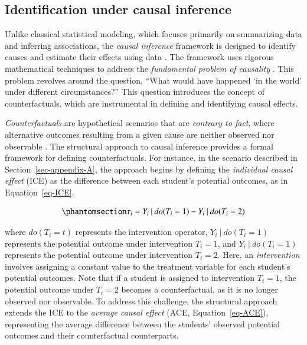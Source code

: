 \documentclass[
  authoryear,
  review,
  1p]{elsarticle}
\begin{document}
\subsection{Identification under causal inference}\label{sec-appendix-B}

Unlike classical statistical modeling, which focuses primarily on
summarizing data and inferring associations, the \emph{causal inference}
framework is designed to identify causes and estimate their effects
using data \citep{Shaughnessy_et_al_2010, Neal_2020}. The framework uses
rigorous mathematical techniques to address the \emph{fundamental
problem of causality}
\citep{Pearl_2009, Pearl_et_al_2016, Morgan_et_al_2014}. This problem
revolves around the question, ``What would have happened `in the world'
under different circumstances?'' This question introduces the concept of
counterfactuals, which are instrumental in defining and identifying
causal effects.

\emph{Counterfactuals} are hypothetical scenarios that are
\emph{contrary to fact}, where alternative outcomes resulting from a
given cause are neither observed nor observable
\citep{Neal_2020, Counterfactual_2024}. The structural approach to
causal inference \citep{Pearl_2009, Pearl_et_al_2016} provides a formal
framework for defining counterfactuals. For instance, in the scenario
described in Section~\ref{sec-appendix-A}, the approach begins by
defining the \emph{individual causal effect} (ICE) as the difference
between each student's potential outcomes, as in Equation~\ref{eq-ICE}.

\begin{equation}\phantomsection\label{eq-ICE}{
\tau_{i} = Y_{i} \:|\:do(T_{i}=1) - Y_{i} \:|\:do(T_{i}=2)
}\end{equation}

where \(do(T_{i}=t)\) represents the intervention operator,
\(Y_{i} \:|\:do(T_{i}=1)\) represents the potential outcome under
intervention \(T_{i}=1\), and \(Y_{i} \:|\:do(T_{i}=1)\) represents the
potential outcome under intervention \(T_{i}=2\). Here, an
\emph{intervention} involves assigning a constant value to the treatment
variable for each student's potential outcomes. Note that if a student
is assigned to intervention \(T_{i}=1\), the potential outcome under
\(T_{i}=2\) becomes a counterfactual, as it is no longer observed nor
observable. To address this challenge, the structural approach extends
the ICE to the \emph{average causal effect} (ACE,
Equation~\ref{eq-ACE}), representing the average difference between the
students' observed potential outcomes and their counterfactual
counterparts.
\end{document}
